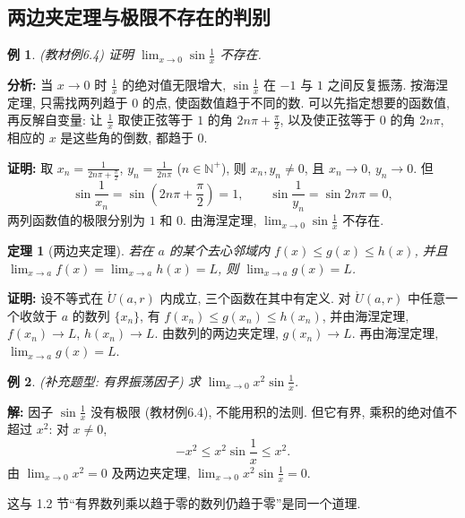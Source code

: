 \documentclass[UTF8,openany]{ctexbook}
\theoremstyle{chinesetextbook}
\newtheorem{example}{例}[section]
\newtheorem{theorem}{定理}[section]
\newenvironment{cnproof}{\par\indent\textbf{证明:} \ignorespaces}{\par}
\newenvironment{cnsolution}{\par\indent\textbf{解:} \ignorespaces}{\par}
\begin{document}
\subsection{两边夹定理与极限不存在的判别}
\begin{example}
\textnormal{(教材例6.4)} 证明 $\displaystyle\lim_{x\to0}\sin\frac1x$ 不存在.
\end{example}
\par\indent\textbf{分析:} 当 $x\to0$ 时 $\displaystyle\frac1x$ 的绝对值无限增大, $\displaystyle\sin\frac1x$ 在 $-1$ 与 $1$ 之间反复振荡. 按海涅定理, 只需找两列趋于 $0$ 的点, 使函数值趋于不同的数. 可以先指定想要的函数值, 再反解自变量: 让 $\displaystyle\frac1x$ 取使正弦等于 $1$ 的角 $\displaystyle2n\pi+\frac\pi2$, 以及使正弦等于 $0$ 的角 $2n\pi$, 相应的 $x$ 是这些角的倒数, 都趋于 $0$.
\begin{cnproof}
取 $\displaystyle x_n=\frac1{2n\pi+\frac\pi2}$, $\displaystyle y_n=\frac1{2n\pi}$ ($n\in\mathbb N^+$), 则 $x_n,y_n\ne0$, 且 $x_n\to0$, $y_n\to0$. 但
\[
\sin\frac1{x_n}=\sin\left(2n\pi+\frac\pi2\right)=1,\qquad\sin\frac1{y_n}=\sin2n\pi=0,
\]
两列函数值的极限分别为 $1$ 和 $0$. 由海涅定理, $\displaystyle\lim_{x\to0}\sin\frac1x$ 不存在.
\end{cnproof}
\begin{theorem}[两边夹定理]
若在 $a$ 的某个去心邻域内 $f(x)\le g(x)\le h(x)$, 并且 $\displaystyle\lim_{x\to a}f(x)=\lim_{x\to a}h(x)=L$, 则 $\displaystyle\lim_{x\to a}g(x)=L$.
\end{theorem}
\begin{cnproof}
设不等式在 $\mathring U(a,r)$ 内成立, 三个函数在其中有定义. 对 $\mathring U(a,r)$ 中任意一个收敛于 $a$ 的数列 $\{x_n\}$, 有 $f(x_n)\le g(x_n)\le h(x_n)$, 并由海涅定理, $f(x_n)\to L$, $h(x_n)\to L$. 由数列的两边夹定理, $g(x_n)\to L$. 再由海涅定理, $\displaystyle\lim_{x\to a}g(x)=L$.
\end{cnproof}
\begin{example}
\textnormal{(补充题型: 有界振荡因子)} 求 $\displaystyle\lim_{x\to0}x^2\sin\frac1x$.
\end{example}
\begin{cnsolution}
因子 $\displaystyle\sin\frac1x$ 没有极限 (教材例6.4), 不能用积的法则. 但它有界, 乘积的绝对值不超过 $x^2$: 对 $x\ne0$,
\[
-x^2\le x^2\sin\frac1x\le x^2.
\]
由 $\displaystyle\lim_{x\to0}x^2=0$ 及两边夹定理, $\displaystyle\lim_{x\to0}x^2\sin\frac1x=0$.
\end{cnsolution}
这与 1.2 节“有界数列乘以趋于零的数列仍趋于零”是同一个道理.
\end{document}
